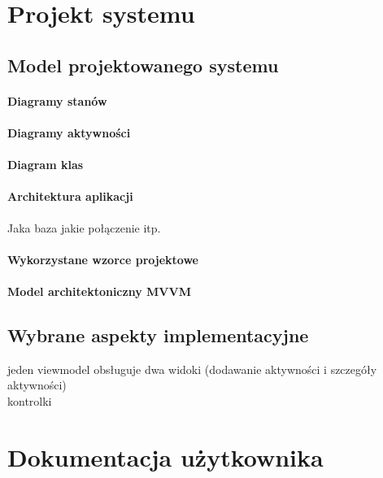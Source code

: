 \documentclass[12pt,oneside]{report}
\begin{document}
\chapter{Projekt systemu}
\section{Model projektowanego systemu}
\subsubsection{Diagramy stanów}
\subsubsection{Diagramy aktywności}
\subsubsection{Diagram klas}
\subsubsection{Architektura aplikacji}
Jaka baza jakie połączenie itp.
\subsubsection{Wykorzystane wzorce projektowe}
\subsubsection{Model architektoniczny MVVM}
\section{Wybrane aspekty implementacyjne}
jeden viewmodel obsługuje dwa widoki (dodawanie aktywności i szczegóły aktywności) \\
kontrolki\\
\chapter{Dokumentacja użytkownika}
\end{document}
